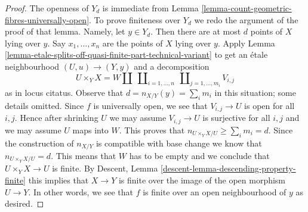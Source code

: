 \documentclass[10pt,a4paper]{amsart}
\theoremstyle{plain}
\theoremstyle{definition}
\theoremstyle{remark}
\numberwithin{equation}{subsection}
\begin{document}
\begin{proof}
The openness of $Y_d$ is immediate from
Lemma \ref{lemma-count-geometric-fibres-universally-open}.
To prove finiteness over $Y_d$ we redo the argument of the
proof of that lemma. Namely, let $y \in Y_d$. Then there are
at most $d$ points of $X$ lying over $y$. Say
$x_1, \ldots, x_n$ are the points of $X$
lying over $y$. Apply
Lemma \ref{lemma-etale-splits-off-quasi-finite-part-technical-variant}
to get an \'etale neighbourhood $(U, u) \to (Y, y)$ and a decomposition
$$
U \times_Y X =
W \amalg
\ \coprod\nolimits_{i = 1, \ldots, n}
\ \coprod\nolimits_{j = 1, \ldots, m_i}
V_{i, j}
$$
as in locus citatus. Observe that $d = n_{X/Y}(y) = \sum_i m_i$
in this situation; some details omitted.
Since $f$ is universally open, we see
that $V_{i, j} \to U$ is open for all $i, j$. Hence after shrinking
$U$ we may assume $V_{i, j} \to U$ is surjective
for all $i, j$ and we may assume $U$ maps into $W$.
This proves that $n_{U \times_Y X/U} \geq \sum_i m_i = d$.
Since the construction of $n_{X/Y}$ is compatible with
base change we know that $n_{U \times_Y X/U} = d$. This means that
$W$ has to be empty and we conclude that $U \times_Y X \to U$ is finite.
By Descent, Lemma \ref{descent-lemma-descending-property-finite}
this implies that $X \to Y$ is finite over
the image of the open morphism $U \to Y$. In other words,
we see that $f$ is finite over an open neighbourhood of $y$
as desired.
\end{proof}
\end{document}
